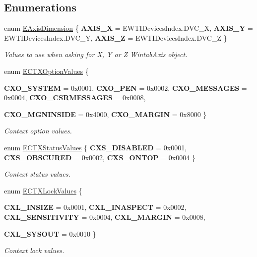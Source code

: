 \subsection*{Enumerations}
\begin{DoxyCompactItemize}
\item 
enum \hyperlink{namespace_wintab_d_n_a38705aa38c49c04846399172fa9fd1cd}{EAxisDimension} \{ {\bfseries AXIS\_\-X} =  EWTIDevicesIndex.DVC\_\-X, 
{\bfseries AXIS\_\-Y} =  EWTIDevicesIndex.DVC\_\-Y, 
{\bfseries AXIS\_\-Z} =  EWTIDevicesIndex.DVC\_\-Z
 \}
\begin{DoxyCompactList}\small\item\em Values to use when asking for X, Y or Z WintabAxis object. \item\end{DoxyCompactList}\item 
enum \hyperlink{namespace_wintab_d_n_a701e8021b6889039ed562596a2d1bdd2}{ECTXOptionValues} \{ \par
{\bfseries CXO\_\-SYSTEM} =  0x0001, 
{\bfseries CXO\_\-PEN} =  0x0002, 
{\bfseries CXO\_\-MESSAGES} =  0x0004, 
{\bfseries CXO\_\-CSRMESSAGES} =  0x0008, 
\par
{\bfseries CXO\_\-MGNINSIDE} =  0x4000, 
{\bfseries CXO\_\-MARGIN} =  0x8000
 \}
\begin{DoxyCompactList}\small\item\em Context option values. \item\end{DoxyCompactList}\item 
enum \hyperlink{namespace_wintab_d_n_a6d3f719c7eebc1f9b081c2d31678536e}{ECTXStatusValues} \{ {\bfseries CXS\_\-DISABLED} =  0x0001, 
{\bfseries CXS\_\-OBSCURED} =  0x0002, 
{\bfseries CXS\_\-ONTOP} =  0x0004
 \}
\begin{DoxyCompactList}\small\item\em Context status values. \item\end{DoxyCompactList}\item 
enum \hyperlink{namespace_wintab_d_n_a4ae5c9d600336cd1fe11dd04cd207c31}{ECTXLockValues} \{ \par
{\bfseries CXL\_\-INSIZE} =  0x0001, 
{\bfseries CXL\_\-INASPECT} =  0x0002, 
{\bfseries CXL\_\-SENSITIVITY} =  0x0004, 
{\bfseries CXL\_\-MARGIN} =  0x0008, 
\par
{\bfseries CXL\_\-SYSOUT} =  0x0010
 \}
\begin{DoxyCompactList}\small\item\em Context lock values. \item\end{DoxyCompactList}\item 

\end{DoxyCompactItemize}
